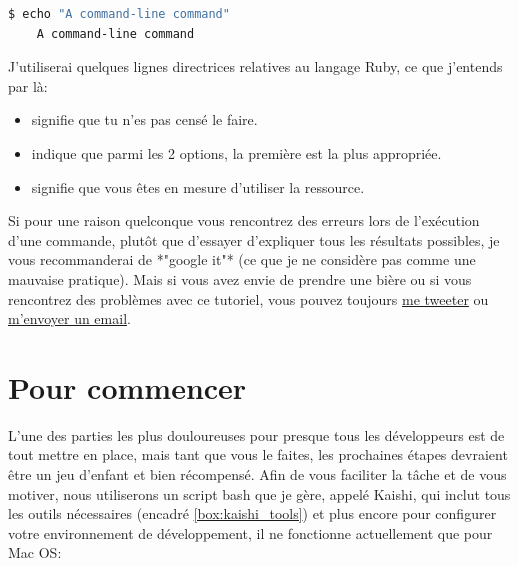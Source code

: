 \documentclass[]{report}
\begin{document}
    \begin{scriptsize}
    \begin{lstlisting}[language=bash]
    $ echo "A command-line command"
    A command-line command
    \end{lstlisting}
    \end{scriptsize}

    J'utiliserai quelques lignes directrices relatives au langage Ruby, ce que j'entends par là:

    \begin{itemize}
      \item {} signifie que tu n'es pas censé le faire.
      \item {} indique que parmi les 2 options, la première est la plus appropriée.
      \item {} signifie que vous êtes en mesure d'utiliser la ressource.
    \end{itemize}

    Si pour une raison quelconque vous rencontrez des erreurs lors de l'exécution d'une commande, plutôt que d'essayer d'expliquer tous les résultats possibles, je vous recommanderai de *"google it"* (ce que je ne considère pas comme une mauvaise pratique). Mais si vous avez envie de prendre une bière ou si vous rencontrez des problèmes avec ce tutoriel, vous pouvez toujours \href{http://twitter.com/kurenn}{me tweeter} ou \href{mailto:kurenn@icalialabs.com}{m'envoyer un email}.

  \section{Pour commencer}

    L'une des parties les plus douloureuses pour presque tous les développeurs est de tout mettre en place, mais tant que vous le faites, les prochaines étapes devraient être un jeu d'enfant et bien récompensé. Afin de vous faciliter la tâche et de vous motiver, nous utiliserons un script bash que je gère, appelé Kaishi, qui inclut tous les outils nécessaires (encadré \ref{box:kaishi_tools}) et plus encore pour configurer votre environnement de développement, il ne fonctionne actuellement que pour Mac OS:
\end{document}

